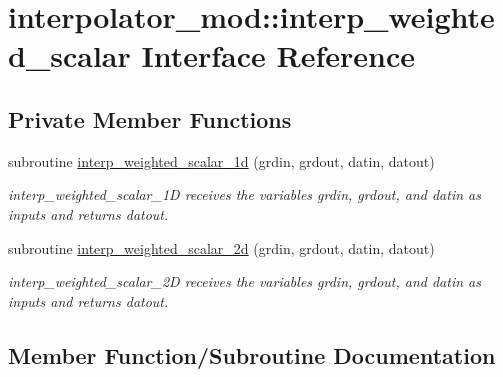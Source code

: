 \hypertarget{interfaceinterpolator__mod_1_1interp__weighted__scalar}{}\section{interpolator\+\_\+mod\+:\+:interp\+\_\+weighted\+\_\+scalar Interface Reference}
\label{interfaceinterpolator__mod_1_1interp__weighted__scalar}
\subsection*{Private Member Functions}
\begin{DoxyCompactItemize}
\item 
subroutine \hyperlink{interfaceinterpolator__mod_1_1interp__weighted__scalar_a69561df3dff17e229926bc200ac37400}{interp\+\_\+weighted\+\_\+scalar\+\_\+1d} (grdin, grdout, datin, datout)
\begin{DoxyCompactList}\small\item\em interp\+\_\+weighted\+\_\+scalar\+\_\+1D receives the variables grdin, grdout, and datin as inputs and returns datout. \end{DoxyCompactList}\item 
subroutine \hyperlink{interfaceinterpolator__mod_1_1interp__weighted__scalar_a2ed9dd59e5380275c2ff537e507f1ea4}{interp\+\_\+weighted\+\_\+scalar\+\_\+2d} (grdin, grdout, datin, datout)
\begin{DoxyCompactList}\small\item\em interp\+\_\+weighted\+\_\+scalar\+\_\+2D receives the variables grdin, grdout, and datin as inputs and returns datout. \end{DoxyCompactList}\end{DoxyCompactItemize}


\subsection{Member Function/\+Subroutine Documentation}
\mbox{\label{interfaceinterpolator__mod_1_1interp__weighted__scalar_a69561df3dff17e229926bc200ac37400}} 
